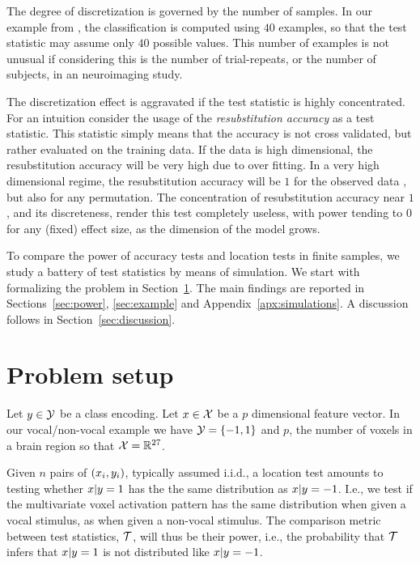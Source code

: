 \documentclass[12pt,a4paper]{article}
\begin{document}
The degree of discretization is governed by the number of samples. 
In our example from \citet{gilron_quantifying_2016}, the classification is computed using $40$ examples, so that the test statistic may assume only $40$ possible values. 
This number of examples is not unusual if considering this is the number of trial-repeats, or the number of subjects, in an neuroimaging study. 

The discretization effect is aggravated if the test statistic is highly concentrated. 
For an intuition consider the usage of the \emph{resubstitution accuracy} as a test statistic. 
This statistic simply means that the accuracy is not cross validated, but rather evaluated on the training data.
If the data is high dimensional, the resubstitution accuracy will be very high due to over fitting. 
In a very high dimensional regime, the resubstitution accuracy will be $1$ for the observed data \cite[Theorem 1]{mclachlan_bias_1976}, but also for any permutation.
The concentration of resubstitution accuracy near $1$, and its discreteness, render this test completely useless, with power tending to $0$ for any (fixed) effect size, as the dimension of the model grows. 


To compare the power of accuracy tests and location tests in finite samples, we study a battery of test statistics by means of simulation. 
We start with formalizing the problem in Section~\ref{sec:problem_setup}.
The main findings are reported in Sections~\ref{sec:power}, \ref{sec:example} and Appendix~\ref{apx:simulations}.
A discussion follows in Section~\ref{sec:discussion}. 



\section{Problem setup}
\label{sec:problem_setup}

Let $y \in \mathcal{Y}$ be a class encoding. 
Let $x \in \mathcal{X}$ be a $p$ dimensional feature vector. 
In our vocal/non-vocal example we have $\mathcal{Y}=\{ -1,1 \}$ and $p$, the number of voxels in a brain region so that $\mathcal{X}=\mathbb{R}^{27}$. 

Given $n$ pairs of $(x_i,y_i)$, typically assumed i.i.d., a location test amounts to testing whether $x|y=1$ has the the same distribution as $x|y=-1$. 
I.e., we test if the multivariate voxel activation pattern has the same distribution when given a vocal stimulus, as when given a non-vocal stimulus. 
The comparison metric between test statistics, $\mathcal{T}$, will thus be their power, i.e., the probability that $\mathcal{T}$ infers that $x|y=1$ is not distributed like $x|y=-1$.
\end{document}
